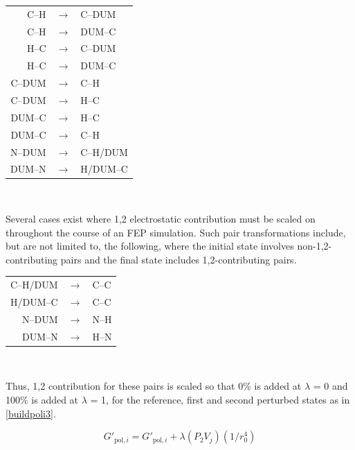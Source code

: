 \documentclass[12pt]{report}
\begin{document}
\vspace*{.4cm}
\begin{singlespace}
{\centering
\begin{tabular}{rcl}
C--H   & $\longrightarrow$ & C--DUM \\
C--H   & $\longrightarrow$ & DUM--C \\
H--C   & $\longrightarrow$ & C--DUM \\
H--C   & $\longrightarrow$ & DUM--C \\
C--DUM & $\longrightarrow$ & C--H \\
C--DUM & $\longrightarrow$ & H--C \\
DUM--C & $\longrightarrow$ & H--C \\
DUM--C & $\longrightarrow$ & C--H \\
N--DUM & $\longrightarrow$ & C--H/DUM \\
DUM--N & $\longrightarrow$ & H/DUM--C \\
\end{tabular}\\}
\end{singlespace}\vspace*{.7cm}

Several cases exist where 1,2 electrostatic contribution must be scaled on throughout the course of an FEP simulation. Such pair transformations include, but are not limited to, the following, where the initial state involves non-1,2-contributing pairs and the final state includes 1,2-contributing pairs.

\vspace*{.5cm}
\begin{singlespace}
{\centering
\begin{tabular}{rcl}
C--H/DUM & $\longrightarrow$ & C--C \\
H/DUM--C & $\longrightarrow$ & C--C \\
N--DUM   & $\longrightarrow$ & N--H \\
DUM--N   & $\longrightarrow$ & H--N \\
\end{tabular}\\}
\end{singlespace}\vspace*{.7cm}

Thus, 1,2 contribution for these pairs is scaled so that 0\% is added at $\lambda$ = 0 and 100\% is added at $\lambda$ = 1, for the reference, first and second perturbed states as in \cref{buildpoli3}.

\begin{equation}
\label{buildpoli3}
G'_{ \textrm{pol},i} = G'_{ \textrm{pol},i} + \lambda(P_{2}V_{j})(1/r^{4}_{0})
\end{equation}
\vspace*{-0.4cm}
\end{document}
